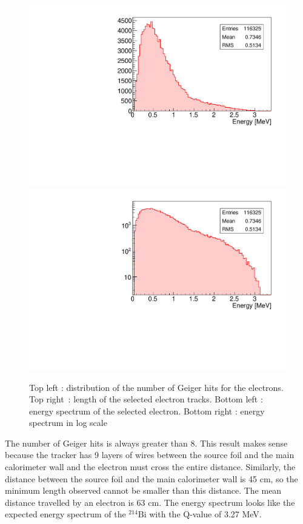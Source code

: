 \documentclass[main.tex]{subfiles}
\begin{document}
\begin{figure}[h!]
\begin{center}
\includegraphics[scale=0.32]{pictures/Chap5/source_selection_surface_energy.pdf}
\includegraphics[scale=0.32]{pictures/Chap5/source_selection_surface_energy_log.pdf}
\caption{Top left : distribution of the number of Geiger hits for the electrons. Top right~: length of the selected electron tracks. Bottom left : energy spectrum of the selected electron. Bottom right : energy spectrum in log scale}
\label{electron_gghit_length_time_energy_sss}
\end{center}
\end{figure}


\bigskip


\noindent The number of Geiger hits is always greater than 8. This result makes sense because the tracker has 9 layers of wires between the source foil and the main calorimeter wall and the electron must cross the entire distance. Similarly, the distance between the source foil and the main calorimeter wall is 45 cm, so the minimum length observed cannot be smaller than this distance. The mean distance travelled by an electron is 63 cm. The energy spectrum looks like the expected energy spectrum of the  $^{\text{214}}$Bi with the Q-value of 3.27 MeV.
\end{document}
